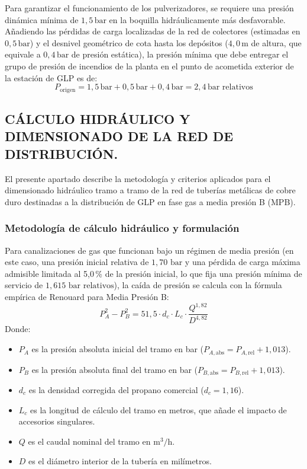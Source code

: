 \documentclass[12pt]{article}
\begin{document}
        Para garantizar el funcionamiento de los pulverizadores, se requiere una presión dinámica mínima de $1,5\,\text{bar}$ en la boquilla hidráulicamente más desfavorable. Añadiendo las pérdidas de carga localizadas de la red de colectores (estimadas en $0,5\,\text{bar}$) y el desnivel geométrico de cota hasta los depósitos ($4,0\,\text{m}$ de altura, que equivale a $0,4\,\text{bar}$ de presión estática), la presión mínima que debe entregar el grupo de presión de incendios de la planta en el punto de acometida exterior de la estación de GLP es de:
        \begin{equation}
            P_{\text{origen}} = 1,5\,\text{bar} + 0,5\,\text{bar} + 0,4\,\text{bar} = 2,4\,\text{bar} \text{ relativos}
        \end{equation}

        \subsection{CÁLCULO HIDRÁULICO Y DIMENSIONADO DE LA RED DE DISTRIBUCIÓN.}
        El presente apartado describe la metodología y criterios aplicados para el dimensionado hidráulico tramo a tramo de la red de tuberías metálicas de cobre duro destinadas a la distribución de GLP en fase gas a media presión B (MPB).
        
        \subsubsection{Metodología de cálculo hidráulico y formulación}
        Para canalizaciones de gas que funcionan bajo un régimen de media presión (en este caso, una presión inicial relativa de $1,70\text{ bar}$ y una pérdida de carga máxima admisible limitada al 5,0\,\% de la presión inicial, lo que fija una presión mínima de servicio de $1,615\text{ bar relativos}$), la caída de presión se calcula con la fórmula empírica de Renouard para Media Presión B:
        \begin{equation}
            P_A^2 - P_B^2 = 51,5 \cdot d_c \cdot L_c \cdot \frac{Q^{1,82}}{D^{4,82}}
        \end{equation}
        Donde:
        \begin{itemize}
            \item $P_A$ es la presión absoluta inicial del tramo en bar ($P_{A,\text{abs}} = P_{A,\text{rel}} + 1,013$).
            \item $P_B$ es la presión absoluta final del tramo en bar ($P_{B,\text{abs}} = P_{B,\text{rel}} + 1,013$).
            \item $d_c$ es la densidad corregida del propano comercial ($d_c = 1,16$).
            \item $L_c$ es la longitud de cálculo del tramo en metros, que añade el impacto de accesorios singulares.
            \item $Q$ es el caudal nominal del tramo en $\text{m}^3\text{/h}$.
            \item $D$ es el diámetro interior de la tubería en milímetros.
        \end{itemize}
\end{document}
